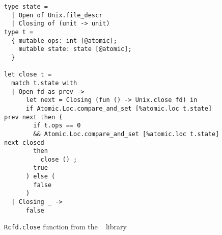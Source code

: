\begin{figure}[tp]
\begin{verbatim}
type state =
  | Open of Unix.file_descr
  | Closing of (unit -> unit)
type t =
  { mutable ops: int [@atomic];
    mutable state: state [@atomic];
  }

let close t =
  match t.state with
  | Open fd as prev ->
      let next = Closing (fun () -> Unix.close fd) in
      if Atomic.Loc.compare_and_set [%atomic.loc t.state] prev next then (
        if t.ops == 0
        && Atomic.Loc.compare_and_set [%atomic.loc t.state] next closed
        then
          close () ;
        true
      ) else (
        false
      )
  | Closing _ ->
      false
\end{verbatim}
\caption{\texttt{Rcfd.close} function from the \Eio~\cite{eio} library}
\label{fig:stack}
\end{figure}